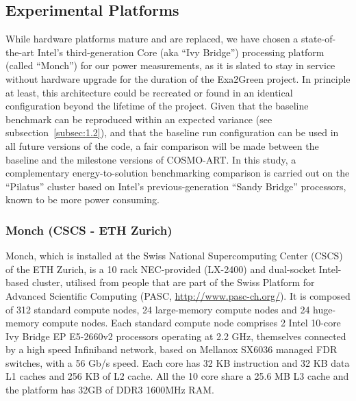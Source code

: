 \subsection{Experimental Platforms}
\label{subsec:2.1}
While hardware  platforms mature  and are replaced,  we have  chosen a
state-of-the-art  Intel's third-generation  Core (aka  ``Ivy Bridge'')
processing platform (called ``Monch'')  for our power measurements, as
it  is slated  to stay  in service  without hardware  upgrade  for the
duration  of  the Exa2Green  project.   In  principle  at least,  this
architecture could be recreated or found in an identical configuration
beyond the lifetime of the project.  Given that the baseline benchmark
can    be    reproduced    within    an   expected    variance    (see
subsection~\ref{subsec:1.2}), and that  the baseline run configuration
can be used in all future versions of the code, a fair comparison will
be made between the baseline  and the milestone versions of COSMO-ART.
In  this   study,  a  complementary   energy-to-solution  benchmarking
comparison is carried out on  the ``Pilatus'' cluster based on Intel's
previous-generation  ``Sandy  Bridge'' processors,  known  to be  more
power consuming.

\subsubsection{Monch (CSCS - ETH Zurich)}
Monch, which is installed  at the Swiss National Supercomputing Center
(CSCS)  of the ETH  Zurich, is  a 10  rack NEC-provided  (LX-2400) and
dual-socket Intel-based cluster, utilised from people that are part of
the   Swiss  Platform   for  Advanced   Scientific   Computing  (PASC,
\url{http://www.pasc-ch.org/}).   It  is   composed  of  312  standard
compute  nodes,  24  large-memory  compute nodes  and  24  huge-memory
compute nodes.   Each standard compute node comprises  2 Intel 10-core
Ivy Bridge  EP E5-2660v2 processors  operating at 2.2  GHz, themselves
connected by a high speed Infiniband network, based on Mellanox SX6036
managed  FDR switches,  with a  56  Gb/s speed.  Each core  has 32  KB
instruction and 32 KB  data L1 caches and 256 KB of  L2 cache. All the
10 core  share a 25.6 MB  L3 cache and  the platform has 32GB  of DDR3
1600MHz RAM.


